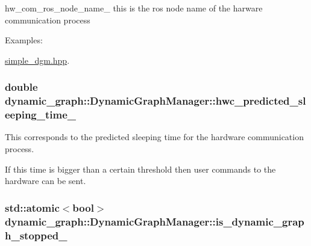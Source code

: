 hw\+\_\+com\+\_\+ros\+\_\+node\+\_\+name\+\_\+ this is the ros node name of the harware communication process 

\begin{Desc}
\item[Examples\+: ]\par
\hyperlink{simple_dgm_8hpp-example}{simple\+\_\+dgm.\+hpp}.\end{Desc}
\subsubsection[{\texorpdfstring{hwc\+\_\+predicted\+\_\+sleeping\+\_\+time\+\_\+}{hwc_predicted_sleeping_time_}}]{\setlength{\rightskip}{0pt plus 5cm}double dynamic\+\_\+graph\+::\+Dynamic\+Graph\+Manager\+::hwc\+\_\+predicted\+\_\+sleeping\+\_\+time\+\_\+\hspace{0.3cm}{\ttfamily [protected]}}\hypertarget{classdynamic__graph_1_1DynamicGraphManager_af5aa11023c1dd272d7bbabdcccc511b6}{}\label{classdynamic__graph_1_1DynamicGraphManager_af5aa11023c1dd272d7bbabdcccc511b6}


This corresponds to the predicted sleeping time for the hardware communication process. 

If this time is bigger than a certain threshold then user commands to the hardware can be sent. 
\subsubsection[{\texorpdfstring{is\+\_\+dynamic\+\_\+graph\+\_\+stopped\+\_\+}{is_dynamic_graph_stopped_}}]{\setlength{\rightskip}{0pt plus 5cm}std\+::atomic$<$bool$>$ dynamic\+\_\+graph\+::\+Dynamic\+Graph\+Manager\+::is\+\_\+dynamic\+\_\+graph\+\_\+stopped\+\_\+\hspace{0.3cm}{\ttfamily [protected]}}\hypertarget{classdynamic__graph_1_1DynamicGraphManager_a87baafbaadf396a7663da653dc5da106}{}\label{classdynamic__graph_1_1DynamicGraphManager_a87baafbaadf396a7663da653dc5da106}


